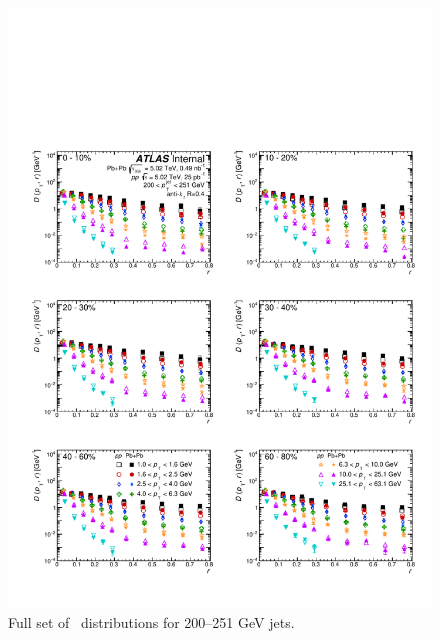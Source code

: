 \begin{figure}[h]
\includegraphics[width=1.0\textwidth]{figures/results/DpT_dR_jet9.pdf}
\caption{Full set of \Dptr\ distributions for 200--251 GeV jets.}
\label{fig:fullset_dptr_j9}
\end{figure}

